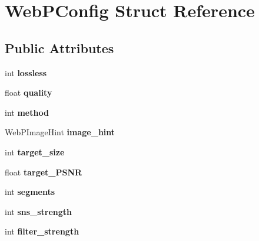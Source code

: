 \hypertarget{structWebPConfig}{}\section{Web\+P\+Config Struct Reference}
\label{structWebPConfig}
\subsection*{Public Attributes}
\begin{DoxyCompactItemize}
\item 
\mbox{\label{structWebPConfig_ae76342aafc7e4e4faae98c8b40b4c426}} 
int {\bfseries lossless}
\item 
\mbox{\label{structWebPConfig_a733ce6ee4f65bd282eaadcbbe2bb1655}} 
float {\bfseries quality}
\item 
\mbox{\label{structWebPConfig_a9ff89da80dbd10d15f510f3c11b86d50}} 
int {\bfseries method}
\item 
\mbox{\label{structWebPConfig_ae55295c3b9a0dc313cd7eb6c35b613cc}} 
Web\+P\+Image\+Hint {\bfseries image\+\_\+hint}
\item 
\mbox{\label{structWebPConfig_a50b7f213fd062a17f60b7976b4b27e1f}} 
int {\bfseries target\+\_\+size}
\item 
\mbox{\label{structWebPConfig_ab0f1a8383cb5b3cb6e6b4584fd5a7810}} 
float {\bfseries target\+\_\+\+P\+S\+NR}
\item 
\mbox{\label{structWebPConfig_af7fa0f65c3e44e92fb26e928cb3e8e8a}} 
int {\bfseries segments}
\item 
\mbox{\label{structWebPConfig_afd11201753c84bdb5bf7412f1879dd83}} 
int {\bfseries sns\+\_\+strength}
\item 
\mbox{\label{structWebPConfig_acf68068ef202d50e2ef8d055d38efe8b}} 
int {\bfseries filter\+\_\+strength}
\item 
\mbox{\label{structWebPConfig_ac51ffb9b9c2931badfb4e18a14c7b5c4}} 

\end{DoxyCompactItemize}
